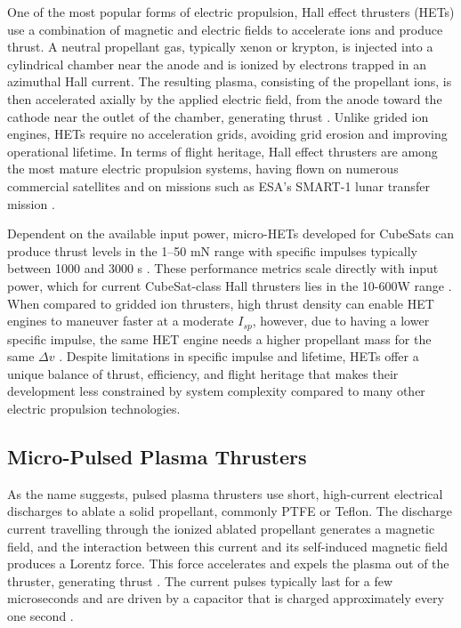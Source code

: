 One of the most popular forms of electric propulsion, Hall effect thrusters (HETs) use a combination of magnetic and electric fields to accelerate ions and produce thrust. A neutral propellant gas, typically xenon or krypton, is injected into a cylindrical chamber near the anode and is ionized by electrons trapped in an azimuthal Hall current. The resulting plasma, consisting of the propellant ions, is then accelerated axially by the applied electric field, from the anode toward the cathode near the outlet of the chamber, generating thrust \cite{tummala-propulsion_summary}\cite{lozano-smallspacecraft_summary}\cite{levchenko-propulsion_summary}. Unlike grided ion engines, \ac{HET}s require no acceleration grids, avoiding grid erosion and improving operational lifetime. In terms of flight heritage, Hall effect thrusters are among the most mature electric propulsion systems, having flown on numerous commercial satellites and on missions such as ESA’s SMART-1 lunar transfer mission \cite{lozano-smallspacecraft_summary}\cite{levchenko-propulsion_summary}.

Dependent on the available input power, micro-HETs developed for CubeSats can produce thrust levels in the 1–50 mN range with specific impulses typically between 1000 and 3000 s \cite{tummala-propulsion_summary}. These performance metrics scale directly with input power, which for current CubeSat-class Hall thrusters lies in the 10-600W range \cite{tummala-propulsion_summary}\cite{levchenko-propulsion_summary}. When compared to gridded ion thrusters, high thrust density can enable \ac{HET} engines to maneuver faster at a moderate $I_{sp}$, however, due to having a lower specific impulse, the same \ac{HET} engine needs a higher propellant mass for the same $\Delta v$ \cite{lozano-smallspacecraft_summary}. Despite limitations in specific impulse and lifetime, \ac{HET}s offer a unique balance of thrust, efficiency, and flight heritage that makes their development less constrained by system complexity compared to many other electric propulsion technologies.

\subsection{Micro-Pulsed Plasma Thrusters}

As the name suggests, pulsed plasma thrusters use short, high-current electrical discharges to ablate a solid propellant, commonly \ac{PTFE} or Teflon. The discharge current travelling through the ionized ablated propellant generates a magnetic field, and the interaction between this current and its self-induced magnetic field produces a Lorentz force. This force accelerates and expels the plasma out of the thruster, generating thrust \cite{lozano-smallspacecraft_summary}\cite{levchenko-propulsion_summary}. The current pulses typically last for a few microseconds and are driven by a capacitor that is charged approximately every one second \cite{tummala-propulsion_summary}.

